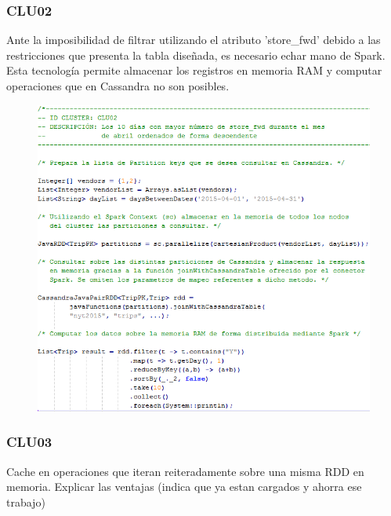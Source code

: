 \clearpage

\subsubsection[]{CLU02}

Ante la imposibilidad de filtrar utilizando el atributo 'store\_fwd' debido a las restricciones que presenta la tabla diseñada, es necesario echar mano de Spark. Esta tecnología permite almacenar los registros en memoria RAM y computar operaciones que en Cassandra no son posibles. 

\begin{figure}[h]
	\centering
	\includegraphics[width=1\textwidth]{Ilustraciones/CLU02.png}
\end{figure}

\clearpage

\subsubsection[]{CLU03}

Cache en operaciones que iteran reiteradamente sobre una misma RDD en memoria. Explicar las ventajas (indica que ya estan cargados y ahorra ese trabajo)

